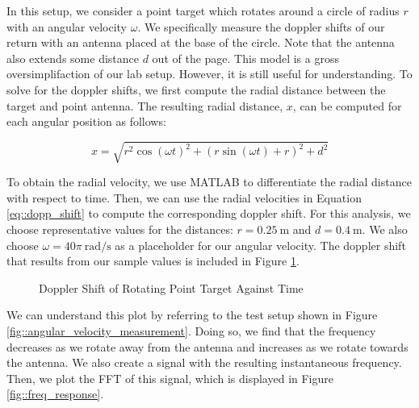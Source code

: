 \documentclass{article}
\begin{document}
\noindent In this setup, we consider a point target which rotates around a circle of radius $r$ with an angular velocity $\omega$. We specifically measure the doppler shifts of our return with an antenna placed at the base of the circle. Note that the antenna also extends some distance $d$ out of the page. This model is a gross oversimplifaction of our lab setup. However, it is still useful for understanding. To solve for the doppler shifts, we first compute the radial distance between the target and point antenna. The resulting radial distance, $x$, can be computed for each angular position as follows:

\begin{equation*}
	x = \sqrt{r^2\cos({\omega}t)^2 + (r\sin({\omega}t) + r)^2 + d^2}
\end{equation*}

\noindent To obtain the radial velocity, we use MATLAB to differentiate the radial distance with respect to time. Then, we can use the radial velocities in Equation \ref{eq::dopp_shift} to compute the corresponding doppler shift. For this analysis, we choose representative values for the distances: $r = 0.25\ \text{m}$ and $d = 0.4\ \text{m}$. We also choose $\omega = 40\pi\ \text{rad}/\text{s}$ as a placeholder for our angular velocity. The doppler shift that results from our sample values is included in Figure \ref{fig::dopp_shift_vs_time}.

\begin{figure}[H]
    	\centering
    	\caption{Doppler Shift of Rotating Point Target Against Time}
    	\label{fig::dopp_shift_vs_time}
\end{figure}
 
\noindent We can understand this plot by referring to the test setup shown in Figure \ref{fig::angular_velocity_measurement}. Doing so, we find that the frequency decreases as we rotate away from the antenna and increases as we rotate towards the antenna. We also create a signal with the resulting instantaneous frequency. Then, we plot the FFT of this signal, which is displayed in Figure \ref{fig::freq_response}.
\end{document}
